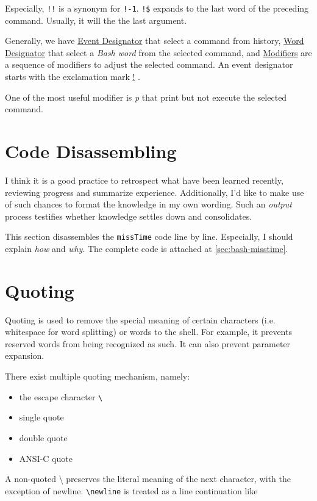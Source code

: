 Especially, \lstinline|!!| is a synonym for
\lstinline|!-1|. \lstinline|!$| expands to the last word of the
preceding command. Usually, it will the the last argument.

Generally, we have \uline{Event Designator} that select a command
from history, \uline{Word Designator} that select a \textit{Bash
  word} from the selected command, and \uline{Modifiers} are a
sequence of modifiers to adjust the selected command. An event
designator starts with the exclamation mark \uline{!} .

One of the most useful modifier is \textit{p} that print but not
execute the selected command.

\section{Code Disassembling}
\label{sec:bash-code-disassembling}

I think it is a good practice to retrospect what have been learned
recently, reviewing progress and summarize
experience. Additionally, I'd like to make use of such chances to
format the knowledge in my own wording. Such an \textit{output}
process testifies whether knowledge settles down and consolidates.

This section disassembles the \verb|missTime| code line by
line. Especially, I should explain \textit{how} and
\textit{why}. The complete code is attached at
\ref{sec:bash-misstime}.

\section{Quoting}
\label{sec:bash-quoting}

Quoting is used to remove the special meaning of certain
characters (i.e. whitespace for word splitting) or words to the
shell. For example, it prevents reserved words from being
recognized as such. It can also prevent parameter expansion.

There exist multiple quoting mechanism, namely:

\begin{itemize}
\item the escape character \verb|\|
\item single quote
\item double quote
\item ANSI-C quote
\end{itemize}

A non-quoted \textbackslash{} preserves the literal meaning of the
next character, with the exception of newline. \verb|\newline| is
treated as a line continuation like

